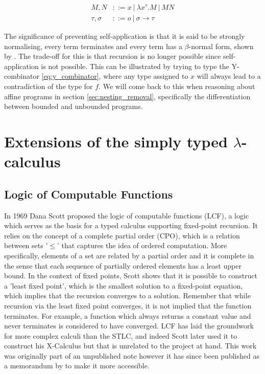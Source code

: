 \documentclass[12pt,a4paper]{report}
\theoremstyle{definition}
\theoremstyle{remark}
\begin{document}
\begin{equation} \label{eq:typed_lambda_calc}
\begin{split}
    M,N &::=x\ |\ \lambda x^{\tau} .M\ |\ MN\\
    \tau , \sigma &::= o\ |\ \sigma \rightarrow \tau
\end{split}
\end{equation}

The significance of preventing self-application is that it is said to be strongly normalising, every term terminates and every term has a $\beta$-normal form, shown by \cite{tait_1967}. The trade-off for this is that recursion is no longer possible since self-application is not possible. This can be illustrated by trying to type the Y-combinator \eqref{eq:y_combinator}, where any type assigned to $x$ will always lead to a contradiction of the type for $f$. We will come back to this when reasoning about affine programs in section \ref{sec:nesting_removal}, specifically the differentiation between bounded and unbounded programs.

\section{Extensions of the simply typed \texorpdfstring{$\lambda$}{lambda}-calculus}
\subsection{Logic of Computable Functions}
In 1969 Dana Scott proposed the logic of computable functions (LCF), a logic which serves as the basis for a typed calculus supporting fixed-point recursion. It relies on the concept of a complete partial order (CPO), which is a relation between sets '$\leq$' that captures the idea of ordered computation. More specifically, elements of a set are related by a partial order and it is complete in the sense that each sequence of partially ordered elements has a least upper bound. In the context of fixed points, Scott shows that it is possible to construct a 'least fixed point', which is the smallest solution to a fixed-point equation, which implies that the recursion converges to a solution. Remember that while recursion via the least fixed point converges, it is not implied that the function terminates. For example, a function which always returns a constant value and never terminates is considered to have converged. LCF has laid the groundwork for more complex calculi than the STLC, and indeed Scott later used it to construct his X-Calculus but that is unrelated to the project at hand. This work was originally part of an unpublished note however it has since been published as a memorandum by \cite{milner_1973} to make it more accessible.
\end{document}

